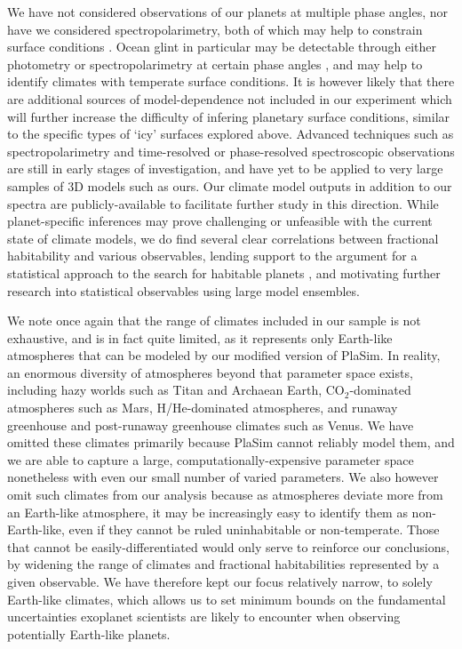 \documentclass[fleqn,usenatbib]{mnras}
\begin{document}
We have not considered observations of our planets at multiple phase angles, nor have we considered spectropolarimetry, both of which may help to constrain surface conditions \citep{Cowan2013,Fujii2017,Trees2019,Wolf2019}. Ocean glint in particular may be detectable through either photometry or spectropolarimetry at certain phase angles \citep{McCullough2006,Stam2008,Williams2008,Robinson2010,Visser2015,Emde2017,Lustig-Yaeger2018}, and may help to identify climates with temperate surface conditions. It is however likely that there are additional sources of model-dependence not included in our experiment which will further increase the difficulty of infering planetary surface conditions, similar to the specific types of `icy' surfaces explored above. Advanced techniques such as spectropolarimetry and time-resolved or phase-resolved spectroscopic observations are still in early stages of investigation, and have yet to be applied to very large samples of 3D models such as ours. Our climate model outputs in addition to our spectra are publicly-available to facilitate further study in this direction. While planet-specific inferences may prove challenging or unfeasible with the current state of climate models, we do find several clear correlations between fractional habitability and various observables, lending support to the argument for a statistical approach to the search for habitable planets \citep{Bean2017,Checlair2019}, and motivating further research into statistical observables using large model ensembles.

We note once again that the range of climates included in our sample is not exhaustive, and is in fact quite limited, as it represents only Earth-like atmospheres that can be modeled by our modified version of PlaSim. In reality, an enormous diversity of atmospheres beyond that parameter space exists, including hazy worlds such as Titan and Archaean Earth, CO$_2$-dominated atmospheres such as Mars, H/He-dominated atmospheres, and runaway greenhouse and post-runaway greenhouse climates such as Venus. We have omitted these climates primarily because PlaSim cannot reliably model them, and we are able to capture a large, computationally-expensive parameter space nonetheless with even our small number of varied parameters. We also however omit such climates from our analysis because as atmospheres deviate more from an Earth-like atmosphere, it may be increasingly easy to identify them as non-Earth-like, even if they cannot be ruled uninhabitable or non-temperate. Those that cannot be easily-differentiated would only serve to reinforce our conclusions, by widening the range of climates and fractional habitabilities represented by a given observable. We have therefore kept our focus relatively narrow, to solely Earth-like climates, which allows us to set minimum bounds on the fundamental uncertainties exoplanet scientists are likely to encounter when observing potentially Earth-like planets.
\end{document}
